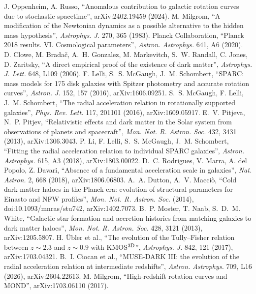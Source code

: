  J. Oppenheim, A. Russo, ``Anomalous contribution to galactic rotation curves due to stochastic spacetime'',
arXiv:2402.19459 (2024).
 M. Milgrom, ``A modification of the Newtonian dynamics as a possible alternative to the hidden mass hypothesis'',
\emph{Astrophys. J.} 270, 365 (1983).
 Planck Collaboration, ``Planck 2018 results. VI. Cosmological parameters'', \emph{Astron. Astrophys.} 641, A6 (2020).
 D. Clowe, M. Brada\v{c}, A.~H. Gonzalez, M. Markevitch, S.~W. Randall, C. Jones, D. Zaritsky, ``A direct empirical proof of
the existence of dark matter'', \emph{Astrophys. J. Lett.} 648, L109 (2006).
 F. Lelli, S.~S. McGaugh, J.~M. Schombert, ``SPARC: mass models for 175 disk galaxies with Spitzer photometry and accurate
rotation curves'', \emph{Astron. J.} 152, 157 (2016), arXiv:1606.09251.
 S.~S. McGaugh, F. Lelli, J.~M. Schombert, ``The radial acceleration relation in rotationally supported galaxies'',
\emph{Phys. Rev. Lett.} 117, 201101 (2016), arXiv:1609.05917.
 E.~V. Pitjeva, N.~P. Pitjev, ``Relativistic effects and dark matter in the Solar system from observations of planets and
spacecraft'', \emph{Mon. Not. R. Astron. Soc.} 432, 3431 (2013), arXiv:1306.3043.
 P. Li, F. Lelli, S.~S. McGaugh, J.~M. Schombert, ``Fitting the radial acceleration relation to individual SPARC galaxies'',
\emph{Astron. Astrophys.} 615, A3 (2018), arXiv:1803.00022.
 D.~C. Rodrigues, V. Marra, A. del Popolo, Z. Davari, ``Absence of a fundamental acceleration scale in galaxies'',
\emph{Nat. Astron.} 2, 668 (2018), arXiv:1806.06803.
 A.~A. Dutton, A.~V. Macci\`o, ``Cold dark matter haloes in the Planck era: evolution of structural parameters for Einasto
and NFW profiles'', \emph{Mon. Not. R. Astron. Soc.} (2014), doi:10.1093/mnras/stu742, arXiv:1402.7073.
 B.~P. Moster, T. Naab, S.~D.~M. White, ``Galactic star formation and accretion histories from matching galaxies to dark
matter haloes'', \emph{Mon. Not. R. Astron. Soc.} 428, 3121 (2013), arXiv:1205.5807.
 H. \"Ubler et al., ``The evolution of the Tully--Fisher relation between $z\sim2.3$ and $z\sim0.9$ with KMOS$^{\rm 3D}$'',
\emph{Astrophys. J.} 842, 121 (2017), arXiv:1703.04321.
 B.~I. Ciocan et al., ``MUSE-DARK III: the evolution of the radial acceleration relation at intermediate redshifts'',
\emph{Astron. Astrophys.} 709, L16 (2026), arXiv:2604.22613.
 M. Milgrom, ``High-redshift rotation curves and MOND'', arXiv:1703.06110 (2017).
